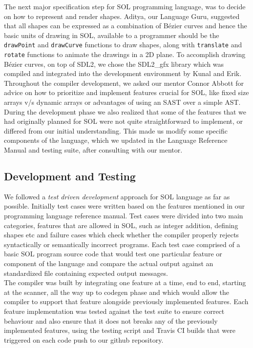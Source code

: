 \documentclass[letterpaper,12pt]{report}
\begin{document}
      The next major specification step for SOL programming language, was to decide on how to represent and render shapes. Aditya, our Language Guru, suggested that all shapes can be expressed as a combination of B\'ezier curves and hence the basic units of drawing in SOL, available to a programmer should be the \texttt{drawPoint} and \texttt{drawCurve} functions to draw shapes, along with \texttt{translate} and \texttt{rotate} functions to animate the drawings in a 2D plane. To accomplish drawing B\'ezier curves, on top of SDL2, we chose the SDL2\_gfx library which was compiled and integrated into the development environment by Kunal and Erik.\\

      Throughout the compiler development, we asked our mentor Connor Abbott for advice on how to prioritize  and implement features crucial for SOL, like fixed size arrays v/s dynamic arrays or advantages of using an SAST over a simple AST. During the development phase we also realized that some of the features that we had originally planned for SOL were not quite straightforward to implement, or differed from our initial understanding. This made us modify some specific components of the language, which we updated in the Language Reference Manual and testing suite, after consulting with our mentor.

    \subsection{Development and Testing}
      We followed a \textit{test driven development} approach for SOL language as far as possible. Initially test cases were written based on the features mentioned in our programming language reference manual. Test cases were divided into two main categories, features that are allowed in SOL, such as integer addition, defining shapes etc and failure cases which check whether the compiler properly rejects syntactically or semantically incorrect programs. Each test case comprised of a basic SOL program source code that would test one particular feature or component of the language and compare the actual output against an standardized file containing expected output messages.\\

      The compiler was built by integrating one feature at a time, end to end, starting at the scanner, all the way up to codegen phase and which would allow the compiler to support that feature alongside previously implemented features. Each feature implementation was tested against the test suite to ensure correct behaviour and also ensure that it does not breaks any of the previously implemented features, using the testing script and Travis CI builds that were triggered on each code push to our github repository.\\
\end{document}
